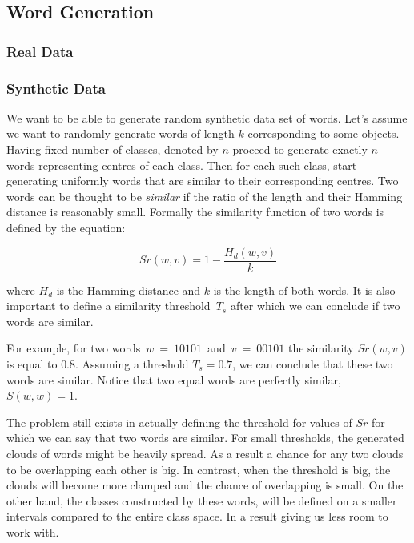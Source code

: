 \documentclass{article}
\begin{document}
\subsection{Word Generation} \label{section:word_gen}

\subsubsection{Real Data} \label{section:word_gen_real}

\subsubsection{Synthetic Data} \label{section:word_gen_synth}
We want to be able to generate random synthetic data set of words. 
Let's assume we want to randomly generate words of length $k$ corresponding to some objects. Having fixed number of classes, denoted by $n$ proceed to generate exactly $n$ words representing centres of each class. Then for each such class, start generating uniformly words that are similar to their corresponding centres. Two words can be thought to be \textit{similar} if the ratio of the length and their Hamming distance is reasonably small. Formally the similarity function of two words is defined by the equation:

\begin{equation}
	Sr(w,v) = 1 - \frac{H_d(w,v)}{k}
\end{equation}

where $H_d$ is the Hamming distance and $k$ is the length of both words. It is also important to define a similarity threshold~$T_s$ after which we can conclude if two words are similar.

For example, for two words~$w~=~10101$~and~$v~=~00101$ the similarity $Sr(w, v)$ is equal to $0.8$. Assuming a threshold $T_s = 0.7$, we can conclude that these two words are similar. Notice that two equal words are perfectly similar, $S(w,w) = 1$.

The problem still exists in actually defining the threshold for values of $Sr$ for which we can say that two words are similar. For small thresholds, the generated clouds of words might be heavily spread. As a result a chance for any two clouds to be overlapping each other is big. In contrast, when the threshold is big, the clouds will become more clamped and the chance of overlapping is small. On the other hand, the classes constructed by these words, will be defined on a smaller intervals compared to the entire class space. In a result giving us less room to work with.
\end{document}
